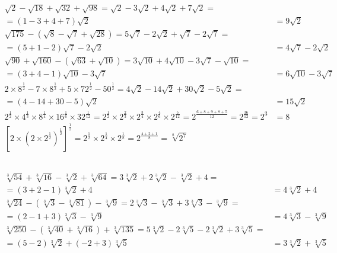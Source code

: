 \documentclass[a4paper,12pt]{article}
\begin{document}
\subsection{} %

\begin{align*}
\sqrt{2} - \sqrt{18} + \sqrt{32} + \sqrt{98}
= \sqrt{2} - 3\sqrt{2} + 4\sqrt{2} + 7\sqrt{2} = \\[6pt]
= (1 - 3 + 4 + 7)\sqrt{2}
&= 9\sqrt{2} \\[6pt]
\sqrt{175} - (\sqrt{8} - \sqrt{7} + \sqrt{28})
= 5\sqrt{7} - 2\sqrt{2} + \sqrt{7} - 2\sqrt{7} = \\[6pt]
= (5 + 1 - 2)\sqrt{7} - 2\sqrt{2}
&= 4\sqrt{7} - 2\sqrt{2} \\[6pt]
\sqrt{90} + \sqrt{160} - (\sqrt{63} + \sqrt{10})
= 3\sqrt{10} + 4\sqrt{10} - 3\sqrt{7} - \sqrt{10} = \\[6pt]
= (3 + 4 - 1)\sqrt{10} - 3\sqrt{7}
&= 6\sqrt{10} - 3\sqrt{7} \\[6pt]
2 \times 8^{\frac{1}{2}} - 7 \times 8^{\frac{1}{2}} + 5 \times 72^{\frac{1}{2}} - 50^{\frac{1}{2}}
= 4\sqrt{2} - 14\sqrt{2} + 30\sqrt{2} - 5\sqrt{2} = \\[6pt]
= (4 - 14 + 30 - 5)\sqrt{2}
&= 15\sqrt{2} \\[6pt]
2^{\frac{1}{2}} \times 4^{\frac{1}{3}} \times 8^{\frac{1}{4}} \times 16^{\frac{1}{6}} \times 32^{\frac{1}{12}}
= 2^{\frac{1}{2}} \times 2^{\frac{2}{3}} \times 2^{\frac{3}{4}} \times 2^{\frac{4}{6}} \times 2^{\frac{5}{12}}
= 2^{\frac{6 + 8 + 9 + 8 + 5}{12}}
= 2^{\frac{36}{12}}
= 2^{3}
&= 8 \\[6pt]
[2 \times (2 \times 2^{\frac{1}{2}})^{\frac{1}{2}}]^{\frac{1}{2}}
= 2^{\frac{1}{2}} \times 2^{\frac{1}{4}} \times 2^{\frac{1}{8}}
= 2^{\frac{4 + 2 + 1}{8}}
= \sqrt[8]{2^7}
\end{align*}

\subsection{} %

\begin{align*}
\sqrt[3]{54} + \sqrt[3]{16} - \sqrt[3]{2} + \sqrt[3]{64}
= 3\sqrt[3]{2} + 2\sqrt[3]{2} - \sqrt[3]{2} + 4 = \\[6pt]
= (3 + 2 - 1)\sqrt[3]{2} + 4 
&= 4\sqrt[3]{2} + 4 \\[6pt]
\sqrt[3]{24} - (\sqrt[3]{3} - \sqrt[3]{81}) - \sqrt[3]{9}
= 2\sqrt[3]{3} - \sqrt[3]{3} + 3\sqrt[3]{3} - \sqrt[3]{9} = \\[6pt]
= (2 - 1 + 3)\sqrt[3]{3} - \sqrt[3]{9}
&= 4\sqrt[3]{3} - \sqrt[3]{9} \\[6pt]
\sqrt[3]{250} - (\sqrt[3]{40} + \sqrt[3]{16}) + \sqrt[3]{135}
= 5\sqrt[3]{2} - 2\sqrt[3]{5} - 2\sqrt[3]{2} + 3\sqrt[3]{5} = \\[6pt]
= (5 - 2)\sqrt[3]{2} + (-2 + 3)\sqrt[3]{5}
&= 3\sqrt[3]{2} + \sqrt[3]{5}
\end{align*}
\end{document}
